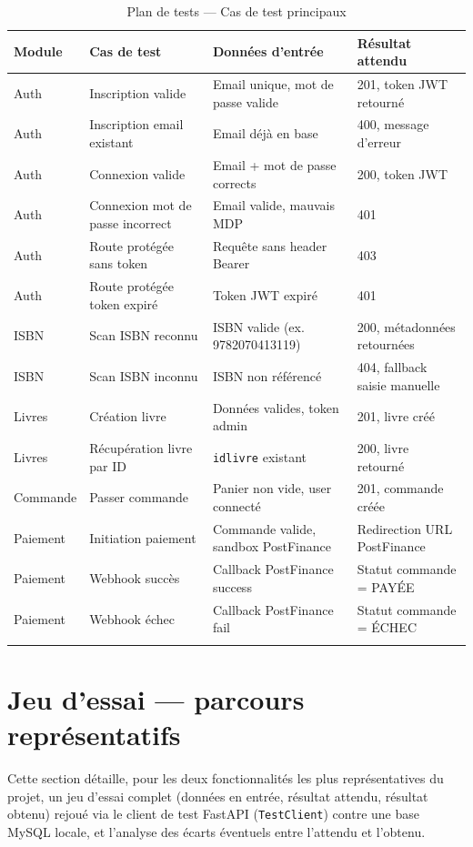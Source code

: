 \documentclass[12pt, a4paper]{report}
\renewcommand{\_}{\origunderscore\allowbreak}
\begin{document}
\begin{longtable}{@{}p{2cm}p{4cm}p{4cm}p{3.5cm}@{}}
\toprule
\textbf{Module} & \textbf{Cas de test} & \textbf{Données d'entrée} & \textbf{Résultat attendu} \\
\midrule
\endhead
Auth & Inscription valide & Email unique, mot de passe valide & 201, token JWT retourné \\
Auth & Inscription email existant & Email déjà en base & 400, message d'erreur \\
Auth & Connexion valide & Email + mot de passe corrects & 200, token JWT \\
Auth & Connexion mot de passe incorrect & Email valide, mauvais MDP & 401 \\
Auth & Route protégée sans token & Requête sans header Bearer & 403 \\
Auth & Route protégée token expiré & Token JWT expiré & 401 \\
ISBN & Scan ISBN reconnu & ISBN valide (ex. 9782070413119) & 200, métadonnées retournées \\
ISBN & Scan ISBN inconnu & ISBN non référencé & 404, fallback saisie manuelle \\
Livres & Création livre & Données valides, token admin & 201, livre créé \\
Livres & Récupération livre par ID & \texttt{id\_livre} existant & 200, livre retourné \\
Commande & Passer commande & Panier non vide, user connecté & 201, commande créée \\
Paiement & Initiation paiement & Commande valide, sandbox PostFinance & Redirection URL PostFinance \\
Paiement & Webhook succès & Callback PostFinance success & Statut commande = PAYÉE \\
Paiement & Webhook échec & Callback PostFinance fail & Statut commande = ÉCHEC \\
\bottomrule
\caption{Plan de tests — Cas de test principaux}
\label{tab:tests}
\end{longtable}

\section{Jeu d'essai — parcours représentatifs}

Cette section détaille, pour les deux fonctionnalités les plus représentatives du projet, un jeu
d'essai complet (données en entrée, résultat attendu, résultat obtenu) rejoué via le client de
test FastAPI (\texttt{TestClient}) contre une base MySQL locale, et l'analyse des écarts
éventuels entre l'attendu et l'obtenu.
\end{document}
